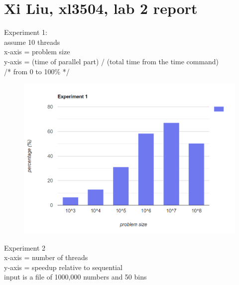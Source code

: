 \documentclass[12pt,border=4pt,multi]{article} %
\begin{document}
\section*{Xi Liu, xl3504, lab 2 report}
Experiment 1:\\
assume 10 threads\\
x-axis = problem size\\
y-axis = (time of parallel part) / (total time from 
the time command)\\
/* from 0 to 100\% */\\
\begin{figure}[h!]
	\centering
	\includegraphics[width=1.1\textwidth, height=0.9\textwidth]{experiment 1} %
\end{figure}
\newpage
\noindent
Experiment 2\\
x-axis = number of threads\\
y-axis = speedup relative to sequential\\
input is a file of 1000,000 numbers and 50 bins\\
\end{document}
